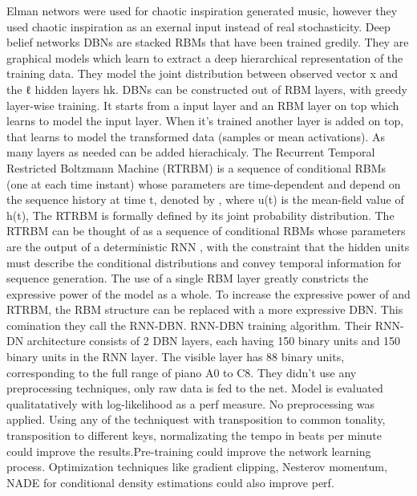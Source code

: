 \cite{Goel2014} Elman networs were used for chaotic inspiration generated music, however they used chaotic inspiration as an exernal input instead of real stochasticity. Deep belief networks DBNs are stacked RBMs that have been trained gredily. They are graphical models which learn to extract a deep hierarchical representation of the training data. They model the joint distribution between observed vector x and the ℓ hidden layers hk. DBNs can be constructed out of RBM layers, with greedy layer-wise training. It starts from a input layer and an RBM layer on top which learns to model the input layer. When it's trained another layer is added on top, that learns to model the transformed data (samples or mean activations). As many layers as needed can be added hierachicaly. The Recurrent Temporal Restricted Boltzmann Machine (RTRBM) is a sequence of conditional RBMs (one at each time instant) whose parameters are time-dependent and depend on the sequence history at time t, denoted by , where u(t) is the mean-field value of h(t), The RTRBM is formally defined by its joint probability distribution. The RTRBM can be thought of as a sequence of conditional RBMs whose parameters are the output of a deterministic RNN , with the constraint that the hidden units must describe the conditional distributions and convey temporal information for sequence generation. The use of a single RBM layer greatly constricts the expressive power of the model as a whole. To increase the expressive power of and RTRBM, the RBM structure can be replaced with a more expressive DBN. This comination they call the RNN-DBN. RNN-DBN training algorithm. Their RNN-DN architecture consists of 2 DBN layers, each having 150 binary units and 150 binary units in the RNN layer. The visible layer has 88 binary units, corresponding to the full range of piano A0 to C8. They didn't use any preprocessing techniques, only raw data is fed to the net. Model is evaluated qualitatatively with log-likelihood as a perf measure. No preprocessing was applied. Using any of the techniquest with transposition to common tonality, transposition to different keys, normalizating the tempo in beats per minute could improve the results.Pre-training could improve the network learning process. Optimization techniques like gradient clipping, Nesterov momentum, NADE for conditional density estimations could also improve perf.

